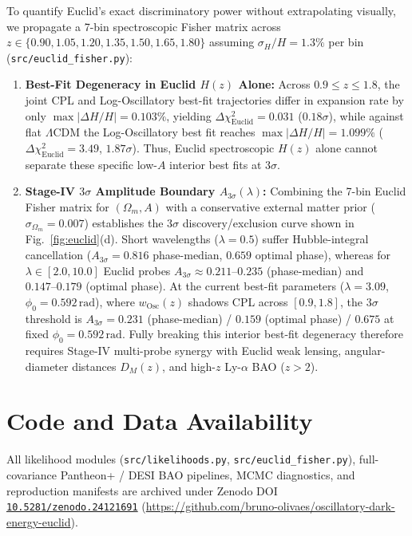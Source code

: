 \documentclass[10pt,twocolumn,a4paper]{article}
\begin{document}
To quantify Euclid's exact discriminatory power without extrapolating visually, we propagate a 7-bin spectroscopic Fisher matrix across $z \in \{0.90, 1.05, 1.20, 1.35, 1.50, 1.65, 1.80\}$ assuming $\sigma_H/H = 1.3\%$ per bin~\cite{blanchard2020} (\texttt{src/euclid\_fisher.py}):
\begin{enumerate}
\item \textbf{Best-Fit Degeneracy in Euclid $H(z)$ Alone:} Across $0.9 \le z \le 1.8$, the joint CPL and Log-Oscillatory best-fit trajectories differ in expansion rate by only $\max|\Delta H/H| = 0.103\%$, yielding $\Delta\chi^2_{\mathrm{Euclid}} = 0.031$ ($0.18\sigma$), while against flat $\Lambda\mathrm{CDM}$ the Log-Oscillatory best fit reaches $\max|\Delta H/H| = 1.099\%$ ($\Delta\chi^2_{\mathrm{Euclid}} = 3.49$, $1.87\sigma$). Thus, Euclid spectroscopic $H(z)$ alone cannot separate these specific low-$A$ interior best fits at $3\sigma$.
\item \textbf{Stage-IV $3\sigma$ Amplitude Boundary $A_{3\sigma}(\lambda)$:} Combining the 7-bin Euclid Fisher matrix for $(\Omega_m, A)$ with a conservative external matter prior ($\sigma_{\Omega_m} = 0.007$) establishes the $3\sigma$ discovery/exclusion curve shown in Fig.~\ref{fig:euclid}(d). Short wavelengths ($\lambda = 0.5$) suffer Hubble-integral cancellation ($A_{3\sigma} = 0.816$ phase-median, $0.659$ optimal phase), whereas for $\lambda \in [2.0, 10.0]$ Euclid probes $A_{3\sigma} \approx 0.211\text{--}0.235$ (phase-median) and $0.147\text{--}0.179$ (optimal phase). At the current best-fit parameters ($\lambda = 3.09$, $\phi_0 = 0.592\,\mathrm{rad}$), where $w_{\mathrm{Osc}}(z)$ shadows CPL across $[0.9, 1.8]$, the $3\sigma$ threshold is $A_{3\sigma} = 0.231$ (phase-median) / $0.159$ (optimal phase) / $0.675$ at fixed $\phi_0 = 0.592\,\mathrm{rad}$. Fully breaking this interior best-fit degeneracy therefore requires Stage-IV multi-probe synergy with Euclid weak lensing, angular-diameter distances $D_M(z)$, and high-$z$ Ly-$\alpha$ BAO ($z > 2$).
\end{enumerate}

\section*{Code and Data Availability}
All likelihood modules (\texttt{src/likelihoods.py}, \texttt{src/euclid\_fisher.py}), full-covariance Pantheon+ / DESI BAO pipelines, MCMC diagnostics, and reproduction manifests are archived under Zenodo DOI \href{https://doi.org/10.5281/zenodo.24121691}{\texttt{10.5281/zenodo.24121691}} (\url{https://github.com/bruno-olivaes/oscillatory-dark-energy-euclid}).
\end{document}
